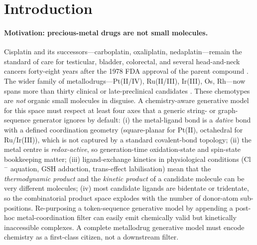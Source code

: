 \section{Introduction}
\label{sec:intro}

\paragraph{Motivation: precious-metal drugs are not small molecules.}
Cisplatin and its successors---carboplatin, oxaliplatin, nedaplatin---remain
the standard of care for testicular, bladder, colorectal, and several head-and-neck
cancers forty-eight years after the 1978 FDA approval of the parent compound
\cite{footnote:cisp_history}.
The wider family of metallodrugs---Pt(II/IV), Ru(II/III), Ir(III), Os, Rh---now
spans more than thirty clinical or late-preclinical candidates
\cite{footnote:metallodrug_review}.
These chemotypes are {\em not} organic small molecules in disguise.
A chemistry-aware generative model for this space must respect at
least four axes that a generic string- or graph-sequence generator
ignores by default:
(i) the metal-ligand bond is a {\em dative} bond with a defined coordination
geometry (square-planar for Pt(II), octahedral for Ru/Ir(III)), which is not
captured by a standard covalent-bond topology;
(ii) the metal centre is {\em redox-active}, so generation-time oxidation-state
and spin-state bookkeeping matter;
(iii) ligand-exchange kinetics in physiological conditions (Cl$^-$
aquation, GSH adduction, trans-effect labilisation) mean that the {\em
thermodynamic product} and the {\em kinetic product} of a candidate
molecule can be very different molecules;
(iv) most candidate ligands are bidentate or tridentate, so the
combinatorial product space explodes with the number of donor-atom
sub-positions.
Re-purposing a token-sequence generative model by appending a
post-hoc metal-coordination filter can easily
emit chemically valid but kinetically inaccessible complexes.
A complete metallodrug generative model must encode chemistry as a
first-class citizen, not a downstream filter.


